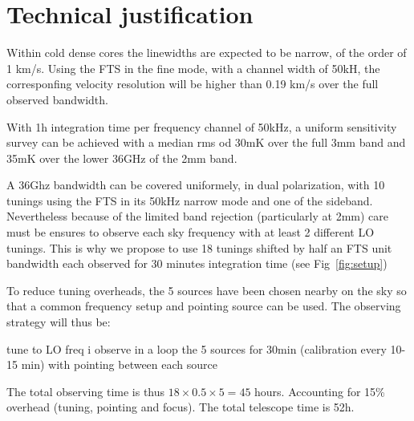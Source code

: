 \section{Technical justification}
  Within cold dense cores the linewidths are expected to be narrow, of the order of 1 km/s. Using the FTS in the fine mode, with a channel width of 50kH, the corresponfing velocity resolution will be higher than 0.19 km/s over the full observed bandwidth. 

With 1h integration time per frequency channel of 50kHz, a uniform sensitivity survey can be achieved with a median rms od 30mK over the full 3mm band and 35mK over the lower 36GHz of the 2mm band. 

A 36Ghz bandwidth can be covered uniformely, in dual polarization, with 10 tunings using the FTS in its 50kHz narrow mode and one of the sideband. Nevertheless because of the limited band rejection (particularly at 2mm) care must be ensures to observe each sky frequency with at least 2 different LO tunings. This is why we propose to use 18 tunings shifted by half an FTS unit bandwidth each observed for 30 minutes integration time (see Fig~\ref{fig:setup})

To reduce tuning overheads, the 5 sources have been chosen nearby on the sky so that a common frequency setup and pointing source can be used. The observing strategy will thus be: 

tune to LO freq i
observe in a loop the 5 sources for 30min (calibration every 10-15 min) with pointing between each source 

The total observing time is thus $18\times0.5\times5=45$ hours. Accounting for 15\% overhead (tuning, pointing and focus). The total telescope time is 52h.
   
  
  
  
  
  
  
  
  